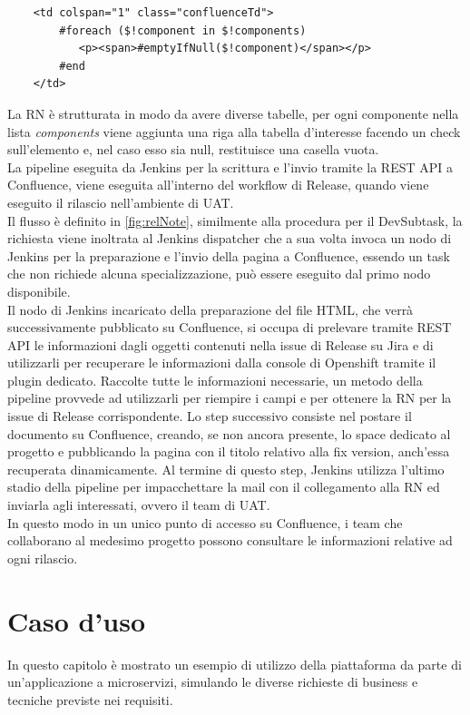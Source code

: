 \documentclass[a4paper, 12pt]{report}
\numberwithin{equation}{section}
\begin{document}
\begin{verbatim}
    <td colspan="1" class="confluenceTd">
        #foreach ($!component in $!components)
           <p><span>#emptyIfNull($!component)</span></p>
        #end
    </td>
\end{verbatim}
La RN è strutturata in modo da avere diverse tabelle, per ogni componente nella lista \emph{components} viene aggiunta una riga alla tabella d'interesse facendo un check sull'elemento e, nel caso esso sia null, restituisce una casella vuota.\\
La pipeline eseguita da Jenkins per la scrittura e l'invio tramite la REST API a Confluence, viene eseguita all'interno del workflow di Release, quando viene eseguito il rilascio nell'ambiente di UAT. \\
Il flusso è definito in \ref{fig:relNote}, similmente alla procedura per il DevSubtask, la richiesta viene inoltrata al Jenkins dispatcher che a sua volta invoca un nodo di Jenkins per la preparazione e l'invio della pagina a Confluence, essendo un task che non richiede alcuna specializzazione, può essere eseguito dal primo nodo disponibile.\\
Il nodo di Jenkins incaricato della preparazione del file HTML, che verrà successivamente pubblicato su Confluence, si occupa di prelevare tramite REST API le informazioni dagli oggetti contenuti nella issue di Release su Jira e di utilizzarli per recuperare le informazioni dalla console di Openshift tramite il plugin dedicato. Raccolte tutte le informazioni necessarie, un metodo della pipeline provvede ad utilizzarli per riempire i campi e per ottenere la RN per la issue di Release corrispondente. Lo step successivo consiste nel postare il documento su Confluence, creando, se non ancora presente, lo space dedicato al progetto e pubblicando la pagina con il titolo relativo alla fix version, anch'essa recuperata dinamicamente. Al termine di questo step, Jenkins utilizza l'ultimo stadio della pipeline per impacchettare la mail con il collegamento alla RN ed inviarla agli interessati, ovvero il team di UAT.\\
In questo modo in un unico punto di accesso su Confluence, i team che collaborano al medesimo progetto possono consultare le informazioni relative ad ogni rilascio.


\chapter{Caso d'uso}
In questo capitolo è mostrato un esempio di utilizzo della piattaforma da parte di un'applicazione a microservizi, simulando le diverse richieste di business e tecniche previste nei requisiti.
\end{document}

